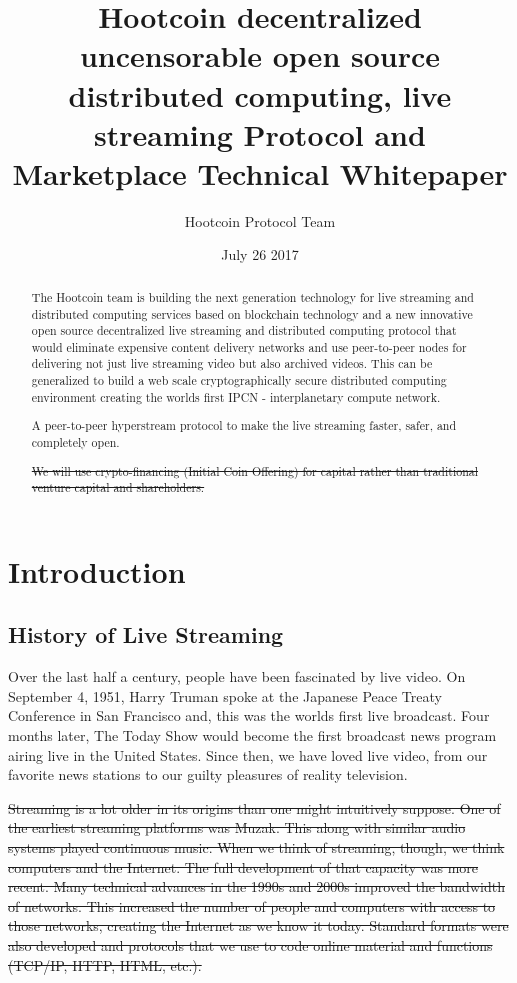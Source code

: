 \documentclass{article}
\title{Hootcoin decentralized uncensorable open source distributed computing, live streaming Protocol and Marketplace Technical Whitepaper}
\author{Hootcoin Protocol Team}
\date{July 26 2017}
\begin{document}
\maketitle

\begin{abstract}
The Hootcoin team is building the next generation technology for live
streaming and distributed computing services based on blockchain technology and a new
innovative open source decentralized live streaming and distributed computing protocol that would eliminate expensive content delivery networks and use peer-to-peer nodes for delivering not just live streaming video but also archived videos. This can be generalized to build a web scale cryptographically secure distributed computing environment creating the worlds first IPCN - interplanetary compute network.

A peer-to-peer hyperstream protocol to make the live streaming faster, safer, and completely open.

\sout{We will use crypto-financing (Initial Coin Offering) for capital rather than traditional venture capital and shareholders.}

\end{abstract}
\newpage

\tableofcontents
\newpage

\section{Introduction}
\subsection{History of Live Streaming}
Over the last half a century, people have been fascinated by live video. On September 4, 1951, Harry Truman spoke at the Japanese Peace Treaty Conference in San Francisco and, this was the worlds first live broadcast. Four months later, The Today Show would become the first broadcast news program airing live in the United States. Since then, we have loved live video, from our favorite news stations to our guilty pleasures of reality television.

\sout{Streaming is a lot older in its origins than one might intuitively suppose. One of the earliest streaming platforms was Muzak. This along with similar audio systems played continuous music. When we think of streaming, though, we think computers and the Internet. The full development of that capacity was more recent. Many technical advances in the 1990s and 2000s improved the bandwidth of networks. This increased the number of people and computers with access to those networks, creating the Internet as we know it today. Standard formats were also developed and protocols that we use to code online material and functions (TCP/IP, HTTP, HTML, etc.).}
\end{document}
